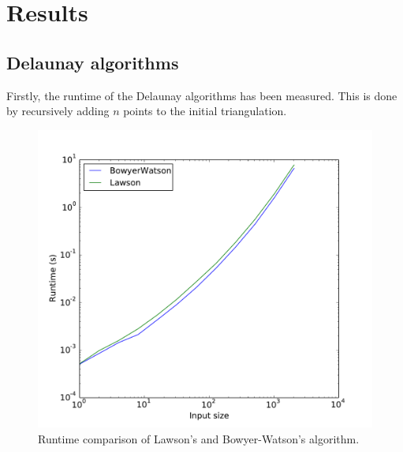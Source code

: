 \section{Results}
\label{sec:results}

\subsection{Delaunay algorithms}
Firstly, the runtime of the Delaunay algorithms has been measured.
This is done by recursively adding $n$ points to the initial triangulation.

\begin{figure}
    \centering
    \includegraphics[width=\columnwidth]{../images/runtime.pdf}
    \caption{Runtime comparison of Lawson's and Bowyer-Watson's algorithm.}
    \label{fig:result_runtime}
\end{figure}

